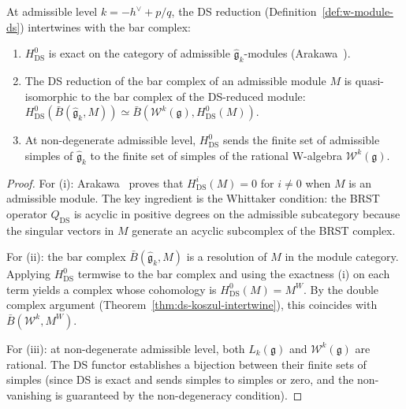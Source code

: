 \begin{proposition}
\label{prop:ds-admissible}
At admissible level $k = -h^\vee + p/q$, the DS reduction
(Definition~\textup{\ref{def:w-module-ds}}) intertwines with
the bar complex\textup{:}
\begin{enumerate}[label=\textup{(\roman*)}]
\item $H^0_{\mathrm{DS}}$ is exact on the category of
  admissible $\widehat{\mathfrak{g}}_k$-modules
  \textup{(}Arakawa~\cite{Arakawa17}\textup{)}.
\item The DS reduction of the bar complex of an admissible
  module $M$ is quasi-isomorphic to the bar complex of the
  DS-reduced module\textup{:}
  $H^0_{\mathrm{DS}}(\bar{B}(\widehat{\mathfrak{g}}_k, M))
  \simeq \bar{B}(\mathcal{W}^k(\mathfrak{g}),
  H^0_{\mathrm{DS}}(M))$.
\item At non-degenerate admissible level, $H^0_{\mathrm{DS}}$
  sends the finite set of admissible simples of
  $\widehat{\mathfrak{g}}_k$ to the finite set of simples of
  the rational W-algebra $\mathcal{W}^k(\mathfrak{g})$.
\end{enumerate}
\end{proposition}

\begin{proof}
For (i): Arakawa~\cite{Arakawa17} proves that $H^i_{\mathrm{DS}}(M) = 0$
for $i \neq 0$ when $M$ is an admissible module.  The key
ingredient is the Whittaker condition: the BRST operator
$Q_{\mathrm{DS}}$ is acyclic in positive degrees on the
admissible subcategory because the singular vectors in
$M$ generate an acyclic subcomplex of the BRST complex.

For (ii): the bar complex $\bar{B}(\widehat{\mathfrak{g}}_k, M)$
is a resolution of $M$ in the module category.  Applying
$H^0_{\mathrm{DS}}$ termwise to the bar complex and using the
exactness (i) on each term yields a complex whose cohomology
is $H^0_{\mathrm{DS}}(M) = M^W$.  By the double complex
argument (Theorem~\ref{thm:ds-koszul-intertwine}), this
coincides with $\bar{B}(\mathcal{W}^k, M^W)$.

For (iii): at non-degenerate admissible level, both
$L_k(\mathfrak{g})$ and $\mathcal{W}^k(\mathfrak{g})$ are
rational.  The DS functor establishes a bijection between
their finite sets of simples (since DS is exact and sends
simples to simples or zero, and the non-vanishing is
guaranteed by the non-degeneracy condition).
\end{proof}


